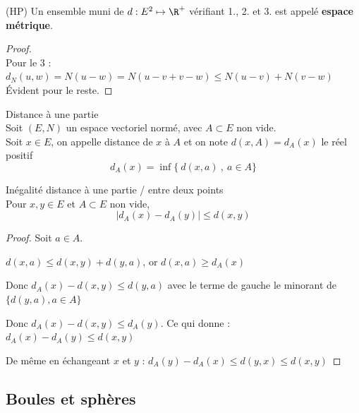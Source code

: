 \begin{remarque}
    (HP) Un ensemble muni de $d : E^2 \mapsto \R^{+}$ vérifiant 1., 2. et 3. est appelé \textbf{espace métrique}.
\end{remarque}

\begin{proof}~\\

    Pour le 3 : $d_N(u, w) = N(u - w) = N( u - v + v - w) \leqslant N(u - v) + N(v - w)$ \\

    Évident pour le reste.
\end{proof}

\begin{definition}{Distance à une partie}{}
    \\Soit $(E, N)$ un espace vectoriel normé, avec $A \subset E$ non vide. \\

    Soit $x \in E$, on appelle distance de $x$ à $A$ et on note $d(x, A) = d_A(x)$ le réel positif
    $$d_A(x) = \inf \{~ d(x, a) ~,~ a \in A\}$$
\end{definition}

\begin{proposition}{Inégalité distance à une partie / entre deux points}{}
    \\Pour $x, y \in E$ et $A \subset E$ non vide, 
    $$|d_A(x) - d_A(y)| \leqslant d(x, y)$$
\end{proposition}


\begin{proof}
    Soit $a \in A$.

    $d(x, a) \leqslant d(x, y) + d(y, a)$, or $d(x, a) \geqslant d_A(x)$

    Donc $d_A(x) - d(x, y) \leqslant d(y, a)$ avec le terme de gauche le minorant de
    $\{d(y, a), a \in A\}$

    Donc $d_A(x) - d(x, y) \leqslant d_A(y)$.
    Ce qui donne : $d_A(x) - d_A(y) \leqslant d(x, y)$

    De même en échangeant $x$ et $y$ : $d_A(y) - d_A(x) \leqslant d(y, x) \leqslant d(x, y)$
\end{proof}

\subsection{Boules et sphères}

